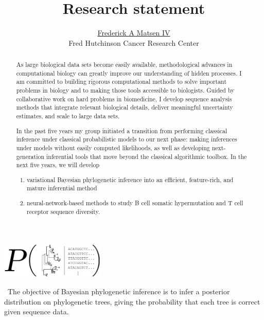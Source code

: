 \documentclass[nobib]{tufte-handout}
\title{Research statement}
\author{\href{http://matsen.fredhutch.org/}{Frederick A Matsen IV}\\Fred Hutchinson Cancer Research Center}
\begin{document}
\maketitle

\begin{abstract}
\noindent
As large biological data sets become easily available, methodological advances in computational biology can greatly improve our understanding of hidden processes.
I am committed to building rigorous computational methods to solve important problems in biology and to making those tools accessible to biologists.
Guided by collaborative work on hard problems in biomedicine, I develop sequence analysis methods that integrate relevant biological details, deliver meaningful uncertainty estimates, and scale to large data sets.

In the past five years my group initiated a transition from performing classical inference under classical probabilistic models to our next phase: making inferences under models without easily computed likelihoods, as well as developing next-generation inferential tools that move beyond the classical algorithmic toolbox.
In the next five years, we will develop
\begin{enumerate}
\item variational Bayesian phylogenetic inference into an efficient, feature-rich, and mature inferential method
\item neural-network-based methods to study B cell somatic hypermutation and T cell receptor sequence diversity.
\end{enumerate}
\end{abstract}

\begin{marginfigure}[1.8in]%
  \includegraphics[width=1.95in]{bayesian_phylo}
  \caption{\
The objective of Bayesian phylogenetic inference is to infer a posterior distribution on phylogenetic trees, giving the probability that each tree is correct given sequence data.
    }
  \label{FIGbayesPhylo}
\end{marginfigure}%


\vspace{0.3cm}
\end{document}
